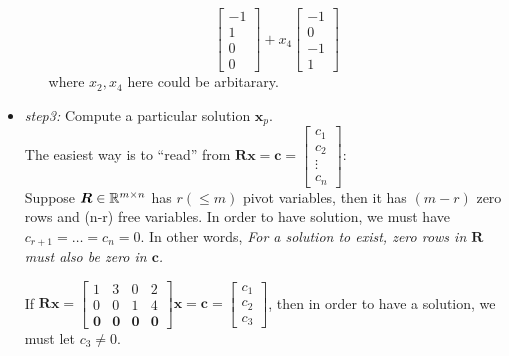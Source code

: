 \begin{itemize}
\begin{itemize}
\begin{example}
\[\begin{bmatrix}
-1\\1\\0\\0
\end{bmatrix} + x_4\begin{bmatrix}
-1\\0\\-1\\1
\end{bmatrix}
\]
where $x_2,x_4$ here could be arbitarary.
\end{example}
\end{itemize}
\item
\emph{step3: }Compute a particular solution $\bm x_p$.\\
The easiest way is to ``read'' from $\bm{Rx} = \bm c = \begin{bmatrix}
c_1\\c_2\\\vdots\\c_n
\end{bmatrix}$:\\
Suppose $\bm R\in\mathbb{R}^{m\times n}$ has $r (\le m)$ pivot variables, then it has $(m-r)$ zero rows and (n-r) free variables. In order to have solution, we must have $c_{r+1}=\dots=c_n=0$. In other words, \emph{For a solution to exist, zero rows in $\bm R$ must also be zero in $\bm c$.}
\begin{example}
If $\bm{Rx} = \begin{bmatrix}
1&3&0&2\\0&0&1&4\\\bm 0&\bm 0&\bm 0&\bm 0
\end{bmatrix}\bm x = \bm c = \begin{bmatrix}
c_1\\c_2\\c_3
\end{bmatrix}$, then in order to have a solution, we must let $c_3\ne 0$.
\end{example}
\newpage


\end{itemize}

